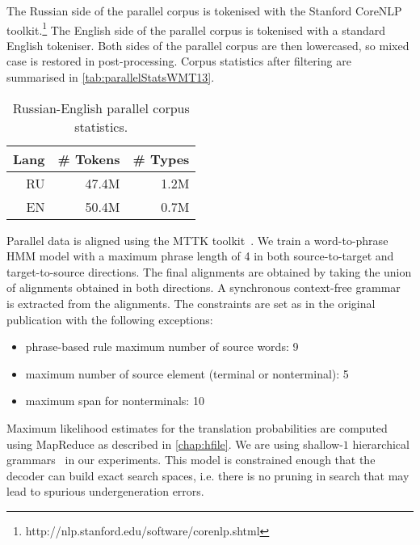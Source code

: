 The Russian side of the parallel corpus is tokenised with the
Stanford CoreNLP toolkit.\footnote{http://nlp.stanford.edu/software/corenlp.shtml}
The English side of the parallel corpus is tokenised with a standard English tokeniser.
Both sides of the parallel corpus are then lowercased, so mixed case is restored in post-processing.
Corpus statistics after filtering are summarised in
\autoref{tab:parallelStatsWMT13}.
%
\begin{table}[htbp]
\begin{center}
\begin{tabular}{*{3}{|r}|}
\hline
Lang & \# Tokens & \# Types \\
\hline
\hline
RU & 47.4M & 1.2M \\
\hline
EN & 50.4M & 0.7M \\
\hline
\end{tabular}
\end{center}
\caption{Russian-English parallel corpus statistics.}
\label{tab:parallelStatsWMT13}
\end{table}
%
Parallel data is aligned using the MTTK
toolkit~\citep{deng-and-byrne:2008:ASLP}.
We train a word-to-phrase HMM model with a maximum phrase length of 4 in both
source-to-target and target-to-source directions. The final alignments are obtained
by taking the union of alignments obtained in both directions.
A synchronous context-free grammar~\citep{chiang:2007:CL}
is extracted from the alignments. The constraints
are set as in the original publication with the following exceptions:
%
\begin{itemize}
  \item phrase-based rule maximum number of source words: 9
  \item maximum number of source element (terminal or nonterminal): 5
  \item maximum span for nonterminals: 10
\end{itemize}
%
Maximum likelihood estimates for the translation probabilities are computed using
MapReduce as described in \autoref{chap:hfile}.
We are using shallow-$1$ hierarchical grammars~\cite{degispert-iglesias-blackwood-banga-byrne:2010:CL} in our 
experiments. This model is constrained enough that the decoder can build exact search spaces,
i.e. there is no pruning in search that may lead to spurious undergeneration errors.


